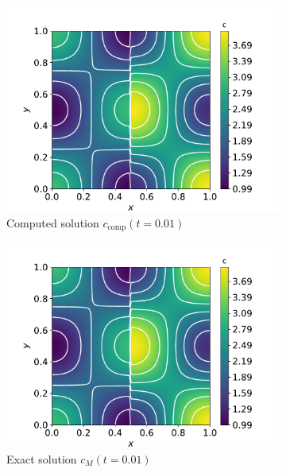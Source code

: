 \begin{figure}  [t]
    \centering
    \begin{subfigure}{0.33\linewidth}
        \centering
        \includegraphics[width=\linewidth]{Figures/Chapter3/monoblocks/interface_condition/u_computed_t0.01.pdf}
        \caption{Computed solution $c_\mathrm{comp}(t=0.01)$}
    \end{subfigure}%
    \begin{subfigure}{0.33\linewidth}
        \centering
        \includegraphics[width=\linewidth]{Figures/Chapter3/monoblocks/interface_condition/u_exact_t0.01.pdf}
        \caption{Exact solution $c_M(t=0.01)$}
    \end{subfigure}%
    \begin{subfigure}{0.33\linewidth}

\end{subfigure}
\end{figure}
